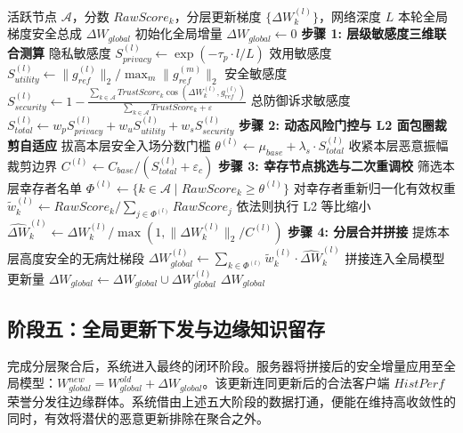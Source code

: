 \documentclass[11pt, a4paper, UTF8, fontset=fandol]{ctexart}
\begin{document}
\begin{algorithm}[htbp]
\caption{基于风险门控的分层差异化聚合与动态裁剪}
\label{alg:phase4}
\begin{algorithmic}[1]
\REQUIRE 活跃节点 $\mathcal{A}$，分数 $RawScore_k$，分层更新梯度 $\{\Delta W_k^{(l)}\}$，网络深度 $L$
\ENSURE 本轮全局梯度安全总成 $\Delta W_{global}$
\STATE 初始化全局增量 $\Delta W_{global} \leftarrow 0$
    \STATE \textbf{步骤 1: 层级敏感度三维联合测算}
    \STATE 隐私敏感度 $S_{privacy}^{(l)} \leftarrow \exp(-\tau_p \cdot l/L)$
    \STATE 效用敏感度 $S_{utility}^{(l)} \leftarrow \|g_{ref}^{(l)}\|_2 / \max_m\|g_{ref}^{(m)}\|_2$
    \STATE 安全敏感度 $S_{security}^{(l)} \leftarrow 1 - \frac{\sum_{k\in\mathcal{A}} TrustScore_k \cos(\Delta W_k^{(l)}, g_{ref}^{(l)})}{\sum_{k\in\mathcal{A}} TrustScore_k + \varepsilon}$
    \STATE 总防御诉求敏感度 $S_{total}^{(l)} \leftarrow w_p S_{privacy}^{(l)} + w_u S_{utility}^{(l)} + w_s S_{security}^{(l)}$
    \STATE \textbf{步骤 2: 动态风险门控与 L2 面包圈裁剪自适应}
    \STATE 拔高本层安全入场分数门槛 $\theta^{(l)} \leftarrow \mu_{base} + \lambda_s \cdot S_{total}^{(l)}$
    \STATE 收紧本层恶意振幅裁剪边界 $C^{(l)} \leftarrow C_{base} / (S_{total}^{(l)} + \varepsilon_c)$
    \STATE \textbf{步骤 3: 幸存节点挑选与二次重调校}
    \STATE 筛选本层幸存者名单 $\Phi^{(l)} \leftarrow \{k \in \mathcal{A} \mid RawScore_k \ge \theta^{(l)}\}$
    \STATE 对幸存者重新归一化有效权重 $\tilde{w}_k^{(l)} \leftarrow RawScore_k / \sum_{j\in\Phi^{(l)}} RawScore_j$
    \STATE 依法则执行 L2 等比缩小 $\widehat{\Delta W}_k^{(l)} \leftarrow \Delta W_k^{(l)} / \max(1, \|\Delta W_k^{(l)}\|_2 / C^{(l)})$
    \STATE \textbf{步骤 4: 分层合并拼接}
    \STATE 提炼本层高度安全的无病灶梯段 $\Delta W_{global}^{(l)} \leftarrow \sum_{k\in\Phi^{(l)}} \tilde{w}_k^{(l)} \cdot \widehat{\Delta W}_k^{(l)}$
    \STATE 拼接连入全局模型更新量 $\Delta W_{global} \leftarrow \Delta W_{global} \cup \Delta W_{global}^{(l)}$
\ENDFOR
\RETURN $\Delta W_{global}$
\end{algorithmic}
\end{algorithm}


\subsection{阶段五：全局更新下发与边缘知识留存}
完成分层聚合后，系统进入最终的闭环阶段。服务器将拼接后的安全增量应用至全局模型：$W_{global}^{new} = W_{global}^{old} + \Delta W_{global}$。该更新连同更新后的合法客户端 $HistPerf$ 荣誉分发往边缘群体。系统借由上述五大阶段的数据打通，便能在维持高收敛性的同时，有效将潜伏的恶意更新排除在聚合之外。
\end{document}
